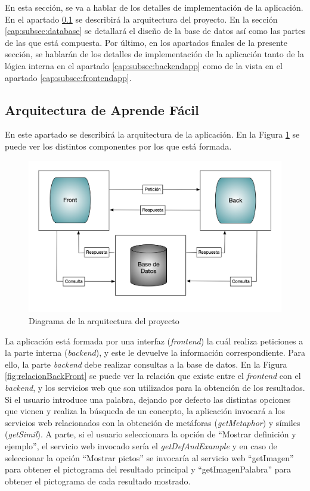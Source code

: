 En esta sección, se va a hablar de los detalles de implementación de la aplicación. En el apartado \ref{cap:subsec:arquitectura} se describirá la arquitectura del proyecto. En la sección \ref{cap:subsec:database} se detallará el diseño de la base de datos así como las partes de las que está compuesta. Por último, en los apartados finales de la presente sección, se hablarán de los detalles de implementación de la aplicación tanto de la lógica interna en el apartado \ref{cap:subsec:backendapp} como de la vista en el apartado \ref{cap:subsec:frontendapp}.


\subsection{Arquitectura de Aprende Fácil}
\label{cap:subsec:arquitectura}
En este apartado se describirá la arquitectura de la aplicación. En la Figura \ref{fig:diagrama_arquitectura} se puede ver los distintos componentes por los que está formada.

\begin{figure}[!h]
	\includegraphics[width=.9\textwidth]{Imagenes/Bitmap/Capitulo4/DiagramaArquitectura.png}
	\centering
	\caption{Diagrama de la arquitectura del proyecto}
	\label{fig:diagrama_arquitectura}
\end{figure}

La aplicación está formada por una interfaz (\textit{frontend}) la cuál realiza peticiones a la parte interna (\textit{backend}), y este le devuelve la información correspondiente. Para ello, la parte \textit{backend} debe realizar consultas a la base de datos. En la Figura \ref{fig:relacionBackFront}  se puede ver la relación que existe entre el \textit{frontend} con el \textit{backend}, y los servicios web que son utilizados para la obtención de los resultados.
Si el usuario introduce una palabra, dejando por defecto las distintas opciones que vienen y realiza la búsqueda de un concepto, la aplicación invocará a los servicios web relacionados con la obtención de metáforas (\textit{getMetaphor}) y símiles (\textit{getSimil}). A parte, si el usuario seleccionara la opción de ``Mostrar definición y ejemplo'', el servicio web invocado sería el \textit{getDefAndExample} y en caso de seleccionar la opción  ``Mostrar pictos'' se invocaría al servicio web ``getImagen'' para obtener el pictograma del resultado principal y ``getImagenPalabra'' para obtener el pictograma de cada resultado mostrado.

